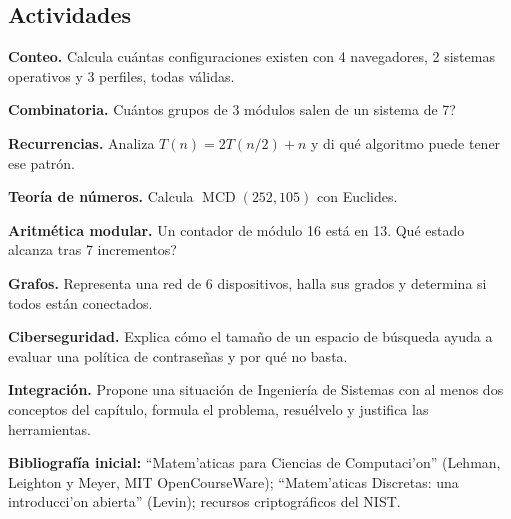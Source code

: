 \subsection{Actividades}
\begin{tmlista}
\item \textbf{Conteo.} Calcula cu\'antas configuraciones existen con 4 navegadores, 2 sistemas operativos y 3 perfiles, todas v\'alidas.
\item \textbf{Combinatoria.} \textquestiondown Cu\'antos grupos de 3 m\'odulos salen de un sistema de 7?
\item \textbf{Recurrencias.} Analiza $T(n)=2T(n/2)+n$ y di qu\'e algoritmo puede tener ese patr\'on.
\item \textbf{Teor\'ia de n\'umeros.} Calcula $\operatorname{MCD}(252, 105)$ con Euclides.
\item \textbf{Aritm\'etica modular.} Un contador de m\'odulo 16 est\'a en 13. \textquestiondown Qu\'e estado alcanza tras 7 incrementos?
\item \textbf{Grafos.} Representa una red de 6 dispositivos, halla sus grados y determina si todos est\'an conectados.
\item \textbf{Ciberseguridad.} Explica c\'omo el tama\~no de un espacio de b\'usqueda ayuda a evaluar una pol\'itica de contrase\~nas y por qu\'e no basta.
\item \textbf{Integraci\'on.} Propone una situaci\'on de Ingenier\'ia de Sistemas con al menos dos conceptos del cap\'itulo, formula el problema, resu\'elvelo y justifica las herramientas.
\end{tmlista}

\begin{tmsistemas}
\textbf{Bibliograf\'ia inicial:} ``Matem'aticas para Ciencias de Computaci'on'' (Lehman, Leighton y Meyer, MIT OpenCourseWare); ``Matem'aticas Discretas: una introducci'on abierta'' (Levin); recursos criptogr\'aficos del NIST.
\end{tmsistemas}


\begin{tmquiz}[Autoevaluaci\'on 2]
\label{quiz:2}
\end{tmquiz}
